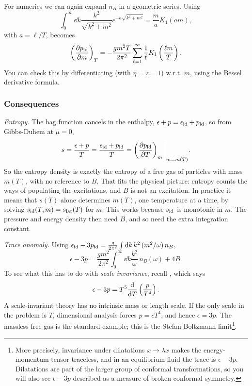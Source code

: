 For numerics we can again expand $n_B$ in a geometric series. Using
\begin{equation}
  \int_0^\infty\dd{k}\frac{k^2}{\sqrt{k^2+m^2}}e^{-a\sqrt{k^2+m^2}}
     =\frac{m}{a}K_1(am),
\end{equation}
with $a=\ell/T$,  becomes
\begin{equation}
  \left(\pdv{p_{\rm id}}{m}\right)_{T}
    =-\frac{gm^2T}{2\pi^2}\sum_{\ell=1}^\infty\frac{1}{\ell}K_1\left(\frac{\ell m}{T}\right).
\end{equation}
You can check this by differentiating 
(with $\eta=z=1$) w.r.t. $m$, using the Bessel derivative formula.

\subsubsection{Consequences}

{\it Entropy.} The bag function cancels in the enthalpy,
$\epsilon+p=\epsilon_{\rm id}+p_{\rm id}$, so from Gibbs-Duhem at $\mu=0$,
\begin{equation}\label{eq:qpentropy}
  s=\frac{\epsilon+p}{T}=\frac{\epsilon_{\rm id}+p_{\rm id}}{T}
   =\left(\pdv{p_{\rm id}}{T}\right)_{m}\Bigg|_{m=m(T)}.
\end{equation}
So the entropy density is exactly the entropy of a free gas of
particles with mass $m(T)$, with no reference to $B$. That fits the
physical picture: entropy counts the ways of populating the
excitations, and $B$ is not an excitation. In practice it means
that $s(T)$ alone determines $m(T)$, one temperature at a time,
by solving $s_{\rm id}(T,m)=s_{\rm lat}(T)$ for $m$.
This works because $s_{\rm id}$ is monotonic in $m$. The pressure and energy
density then need $B$, and so need the extra integration constant.

{\it Trace anomaly.} Using $\epsilon_{\rm id}-3p_{\rm id}
=\frac{g}{2\pi^2}\int\dd{k}k^2\,(m^2/\omega)\,n_B$,
\begin{equation}
  \epsilon-3p=\frac{gm^2}{2\pi^2}\int_0^\infty\dd{k}\frac{k^2}{\omega}\,
     n_B(\omega)+4B.
\end{equation}
To see what this has to do with {\it scale invariance}, recall , which says
\begin{equation}
  \epsilon-3p=T^5\dv{T}\left(\frac{p}{T^4}\right).
\end{equation}
A scale-invariant theory has no intrinsic mass or length scale. If
the only scale in the problem is $T$, dimensional analysis forces $p=cT^4$, and
hence $\epsilon=3p$. The massless free gas is the standard example; this is the
Stefan-Boltzmann limit\footnote{More precisely, invariance under dilatations
$x\to\lambda x$ makes the energy-momentum tensor traceless, and in an
equilibrium fluid the trace is $\epsilon-3p$. Dilatations are part of
the larger group of conformal transformations, so you will also see
$\epsilon-3p$ described as a measure of broken conformal symmetry.}.

